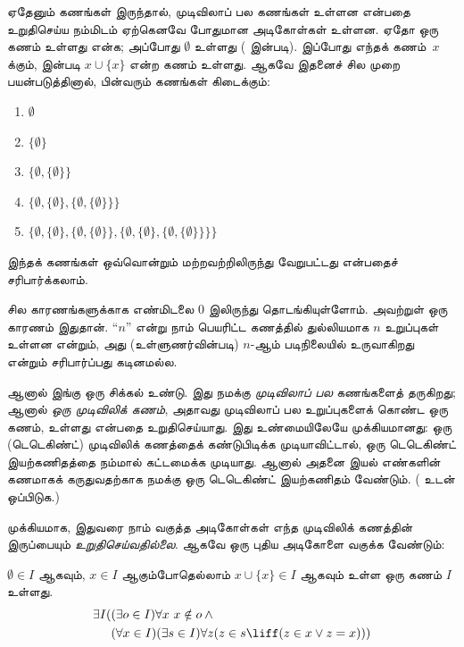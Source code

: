 \documentclass[../../../include/open-logic-section]{subfiles}
\begin{document}

ஏதேனும் கணங்கள் இருந்தால், முடிவிலாப் பல கணங்கள் உள்ளன என்பதை உறுதிசெய்ய
நம்மிடம் ஏற்கெனவே போதுமான அடிகோள்கள் உள்ளன. ஏதோ ஒரு கணம் உள்ளது என்க;
அப்போது $\emptyset$ உள்ளது
( இன்படி). இப்போது எந்தக் கணம்~$x$
க்கும்,  இன்படி
$x \cup \{x\}$ என்ற கணம் உள்ளது. ஆகவே இதனைச் சில முறை பயன்படுத்தினால்,
பின்வரும் கணங்கள் கிடைக்கும்:
\begin{enumerate}
	\item[0.] $\emptyset$ %
	\item[1.] $ \{\emptyset\}$ %
	\item[2.] $\{\emptyset, \{\emptyset\}\}$ %
	\item[3.] $\{\emptyset, \{\emptyset\}, \{\emptyset, \{\emptyset\}\}\}$ %
	\item[4.] $\{\emptyset, \{\emptyset\}, \{\emptyset, \{\emptyset\}\}, \{\emptyset, \{\emptyset\}, \{\emptyset, \{\emptyset\}\}\}\}$%
\end{enumerate}
இந்தக் கணங்கள் ஒவ்வொன்றும் மற்றவற்றிலிருந்து வேறுபட்டது என்பதைச்
சரிபார்க்கலாம்.

சில காரணங்களுக்காக எண்மிடலை $0$ இலிருந்து தொடங்கியுள்ளோம். அவற்றுள் ஒரு
காரணம் இதுதான். ``$n$'' என்று நாம் பெயரிட்ட கணத்தில் துல்லியமாக $n$
உறுப்புகள் உள்ளன என்றும், அது (உள்ளுணர்வின்படி) $n$-ஆம் படிநிலையில்
உருவாகிறது என்றும் சரிபார்ப்பது கடினமல்ல.

ஆனால் இங்கு ஒரு சிக்கல் உண்டு. இது நமக்கு \emph{முடிவிலாப் பல} கணங்களைத்
தருகிறது; ஆனால் \emph{ஒரு முடிவிலிக் கணம்}, அதாவது முடிவிலாப் பல
உறுப்புகளைக் கொண்ட ஒரு கணம், உள்ளது என்பதை உறுதிசெய்யாது. இது உண்மையிலேயே
முக்கியமானது: ஒரு (டெடெகிண்ட்) முடிவிலிக் கணத்தைக் கண்டுபிடிக்க முடியாவிட்டால்,
ஒரு டெடெகிண்ட் இயற்கணிதத்தை நம்மால் கட்டமைக்க முடியாது. ஆனால் அதனை இயல்
எண்களின் கணமாகக் கருதுவதற்காக நமக்கு ஒரு டெடெகிண்ட் இயற்கணிதம் வேண்டும்.
( உடன் ஒப்பிடுக.)

முக்கியமாக, இதுவரை நாம் வகுத்த அடிகோள்கள் எந்த முடிவிலிக் கணத்தின்
இருப்பையும் \emph{உறுதிசெய்வதில்லை}. ஆகவே ஒரு புதிய அடிகோளை வகுக்க
வேண்டும்:

\begin{axiom}[முடிவிலி]
$\emptyset \in I$ ஆகவும், $x \in I$ ஆகும்போதெல்லாம்
$x \cup \{x\} \in I$ ஆகவும் உள்ள ஒரு கணம் $I$ உள்ளது.
\begin{align*}
	\exists I( & (\exists o \in I)\forall x\ x \notin o \land {}\\
	& (\forall x \in I)(\exists s \in I)\forall z(z \in s \liff (z \in x \lor z = x)))
\end{align*}
\end{axiom}
\end{document}
